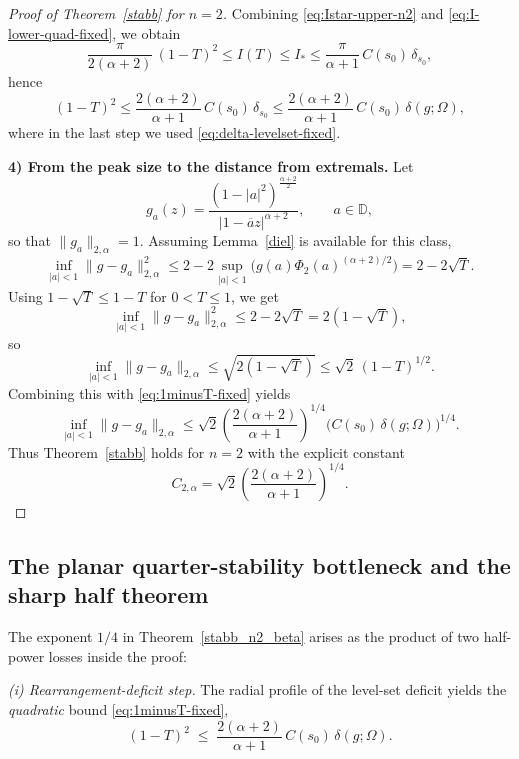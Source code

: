 \documentclass[a4paper,10pt]{amsart}
\newcommand{\D}{\mathbb{D}}
\begin{document}
\begin{proof}[Proof of Theorem~\ref{stabb} for $n=2$]
Combining \eqref{eq:Istar-upper-n2} and \eqref{eq:I-lower-quad-fixed}, we obtain
\[
\frac{\pi}{2(\alpha+2)}\,(1-T)^2
\le I(T)\le I_*
\le \frac{\pi}{\alpha+1}\,C(s_0)\,\delta_{s_0},
\]
hence
\begin{equation}\label{eq:1minusT-fixed}
(1-T)^2
\le
\frac{2(\alpha+2)}{\alpha+1}\,C(s_0)\,\delta_{s_0}
\le
\frac{2(\alpha+2)}{\alpha+1}\,C(s_0)\,\delta(g;\Omega),
\end{equation}
where in the last step we used \eqref{eq:delta-levelset-fixed}.

\smallskip\noindent
\textbf{4) From the peak size to the distance from extremals.}
Let
\[
g_a(z)=
\frac{(1-|a|^2)^{\frac{\alpha+2}{2}}}{|1-\overline{a}z|^{\alpha+2}},
\qquad a\in\D,
\]
so that $\|g_a\|_{2,\alpha}=1$. Assuming Lemma~\ref{diel} is available for this class,
\begin{equation}\label{eq:diel-n2-fixed}
\inf_{|a|<1}\|g-g_a\|_{2,\alpha}^2
\le
2-2\sup_{|a|<1}\bigl(g(a)\Phi_2(a)^{(\alpha+2)/2}\bigr)
=
2-2\sqrt{T}.
\end{equation}
Using $1-\sqrt{T}\le 1-T$ for $0<T\le1$, we get
\[
\inf_{|a|<1}\|g-g_a\|_{2,\alpha}^2
\le
2-2\sqrt{T}
=
2(1-\sqrt{T}),
\]
so
\[
\inf_{|a|<1}\|g-g_a\|_{2,\alpha}
\le
\sqrt{2(1-\sqrt{T})}
\le
\sqrt{2}\,(1-T)^{1/2}.
\]
Combining this with \eqref{eq:1minusT-fixed} yields
\[
\inf_{|a|<1}\|g-g_a\|_{2,\alpha}
\le
\sqrt{2}\left(\frac{2(\alpha+2)}{\alpha+1}\right)^{1/4}
\bigl(C(s_0)\,\delta(g;\Omega)\bigr)^{1/4}.
\]
Thus Theorem~\ref{stabb} holds for $n=2$ with the explicit constant
\[
C_{2,\alpha}
=
\sqrt{2}\left(\frac{2(\alpha+2)}{\alpha+1}\right)^{1/4}.
\]
\end{proof}

\subsection{The planar quarter-stability bottleneck and the sharp half theorem}\label{ssec:sharpness-n2}

The exponent $1/4$ in Theorem~\ref{stabb_n2_beta} arises as the product of two
half-power losses inside the proof:

\smallskip\noindent\emph{(i) Rearrangement-deficit step.} The radial profile of
the level-set deficit yields the \emph{quadratic} bound
\eqref{eq:1minusT-fixed},
\begin{equation}\label{eq:sharpness-step-i}
(1-T)^2\;\le\;\frac{2(\alpha+2)}{\alpha+1}\,C(s_0)\,\delta(g;\Omega).
\end{equation}
\end{document}
